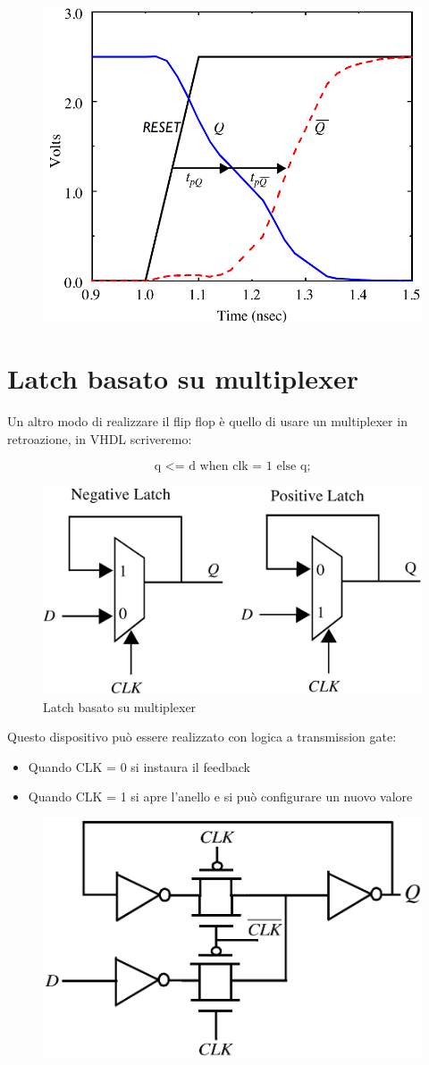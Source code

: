 \begin{figure}[htbp]
    \centering
    \includegraphics[width=0.5\linewidth]{img/adsvdsv.png}
\end{figure}



\section{Latch basato su multiplexer}

Un altro modo di realizzare il flip flop è quello di usare un multiplexer in retroazione, in VHDL scriveremo:

\begin{equation*}
    \text{q <= d when clk = 1 else q;}
\end{equation*}

\begin{figure}[htbp]
    \centering
    \includegraphics[width=0.5\linewidth]{img/FF_mult.png}
    \caption{Latch basato su multiplexer}
\end{figure}

Questo dispositivo può essere realizzato con logica a transmission gate:

\begin{itemize}
    \item[] Quando CLK = 0 si instaura il feedback
    \item[] Quando CLK = 1 si apre l'anello e si può configurare un nuovo valore
\end{itemize}

\newpage
\begin{figure}[htbp]
    \centering
    \includegraphics[width=0.4\linewidth]{img/latch_TG.png}
\end{figure}

